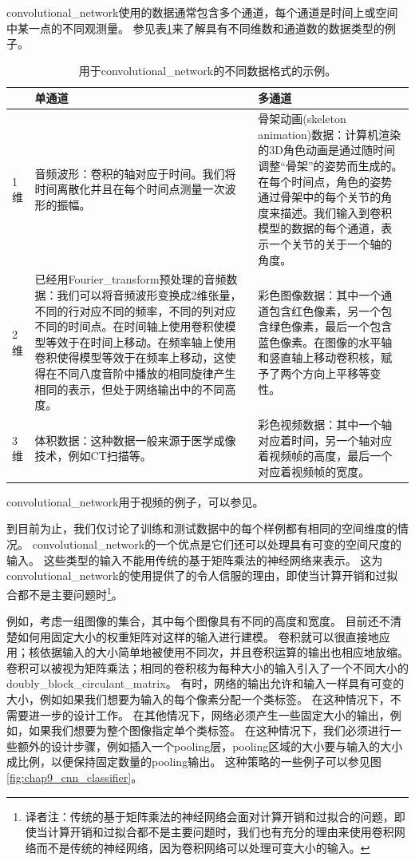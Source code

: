 \gls{convolutional_network}使用的数据通常包含多个通道，每个通道是时间上或空间中某一点的不同观测量。
参见表\ref{table:data_types}来了解具有不同维数和通道数的数据类型的例子。
 
\begin{table}[htbp!]
\centering
 \begin{tabular}[t]{l|p{}|p{}}
& 单通道 & 多通道\\ \hline
1维 & 
音频波形：卷积的轴对应于时间。我们将时间离散化并且在每个时间点测量一次波形的振幅。 &  
骨架动画(skeleton animation)数据：计算机渲染的3D角色动画是通过随时间调整``骨架''的姿势而生成的。 在每个时间点，角色的姿势通过骨架中的每个关节的角度来描述。我们输入到卷积模型的数据的每个通道，表示一个关节的关于一个轴的角度。\\ \hline
2维 & 
已经用\gls{Fourier_transform}预处理的音频数据：我们可以将音频波形变换成2维张量，不同的行对应不同的频率，不同的列对应不同的时间点。在时间轴上使用卷积使模型等效于在时间上移动。在频率轴上使用卷积使得模型等效于在频率上移动，这使得在不同八度音阶中播放的相同旋律产生相同的表示，但处于网络输出中的不同高度。 & %
彩色图像数据：其中一个通道包含红色像素，另一个包含绿色像素，最后一个包含蓝色像素。在图像的水平轴和竖直轴上移动卷积核，赋予了两个方向上平移等变性。\\ \hline
3维 &
体积数据：这种数据一般来源于医学成像技术，例如CT扫描等。 & 
彩色视频数据：其中一个轴对应着时间，另一个轴对应着视频帧的高度，最后一个对应着视频帧的宽度。\\
\end{tabular}
\caption{用于\gls{convolutional_network}的不同数据格式的示例。}
\label{table:data_types}
\end{table}
 
\gls{convolutional_network}用于视频的例子，可以参见\cite{Chen-Ting-2010}。

到目前为止，我们仅讨论了训练和测试数据中的每个样例都有相同的空间维度的情况。
\gls{convolutional_network}的一个优点是它们还可以处理具有可变的空间尺度的输入。
这些类型的输入不能用传统的基于矩阵乘法的神经网络来表示。
这为\gls{convolutional_network}的使用提供了的令人信服的理由，即使当计算开销和过拟合都不是主要问题时\footnote{译者注：传统的基于矩阵乘法的神经网络会面对计算开销和过拟合的问题，即使当计算开销和过拟合都不是主要问题时，我们也有充分的理由来使用卷积网络而不是传统的神经网络，因为卷积网络可以处理可变大小的输入。}。

例如，考虑一组图像的集合，其中每个图像具有不同的高度和宽度。
目前还不清楚如何用固定大小的权重矩阵对这样的输入进行建模。
卷积就可以很直接地应用；核依据输入的大小简单地被使用不同次，并且卷积运算的输出也相应地放缩。
卷积可以被视为矩阵乘法；相同的卷积核为每种大小的输入引入了一个不同大小的\gls{doubly_block_circulant_matrix}。
有时，网络的输出允许和输入一样具有可变的大小，例如如果我们想要为输入的每个像素分配一个类标签。
在这种情况下，不需要进一步的设计工作。
在其他情况下，网络必须产生一些固定大小的输出，例如，如果我们想要为整个图像指定单个类标签。
在这种情况下，我们必须进行一些额外的设计步骤，例如插入一个\gls{pooling}层，\gls{pooling}区域的大小要与输入的大小成比例，以便保持固定数量的\gls{pooling}输出。
这种策略的一些例子可以参见图\ref{fig:chap9_cnn_classifier}。

